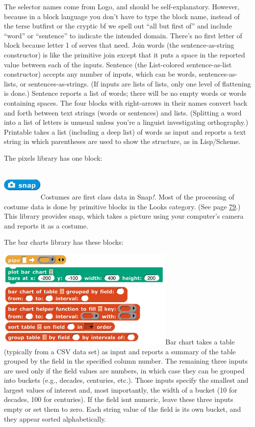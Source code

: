 The selector names come from Logo, and should be self-explanatory.
However, because in a block language you don't have to type the block
name, instead of the terse butfirst or the cryptic bf we spell out ``all
but first of'' and include ``word'' or ``sentence'' to indicate the
intended domain. There's no first letter of block because letter 1 of
serves that need. Join words (the sentence-as-string constructor) is
like the primitive join except that it puts a space in the reported
value between each of the inputs. Sentence (the List-colored
sentence-as-list constructor) accepts any number of inputs, which can be
words, sentences-as-lists, or sentences-as-strings. (If inputs are lists
of lists, only one level of flattening is done.) Sentence reports a list
of words; there will be no empty words or words containing spaces. The
four blocks with right-arrows in their names convert back and forth
between text strings (words or sentences) and lists. (Splitting a word
into a list of letters is unusual unless you're a linguist investigating
orthography.) Printable takes a list (including a deep list) of words as
input and reports a text string in which parentheses are used to show
the structure, as in Lisp/Scheme.

The pixels library has one block:

\includegraphics[width=0.77917in,height=0.62986in]{media/image395.png}Costumes
are first class data in Snap\emph{!}. Most of the processing of costume
data is done by primitive blocks in the Looks category. (See page
\hyperref[media-computation-with-costumes]{79}.) This library provides
snap, which takes a picture using your computer's camera and reports it
as a costume.

The bar charts library has these blocks:

\includegraphics[width=3.43056in,height=1.91667in]{media/image396.png}Bar
chart takes a table (typically from a CSV data set) as input and reports
a summary of the table grouped by the field in the specified column
number. The remaining three inputs are used only if the field values are
numbers, in which case they can be grouped into buckets (e.g., decades,
centuries, etc.). Those inputs specify the smallest and largest values
of interest and, most importantly, the width of a bucket (10 for
decades, 100 for centuries). If the field isn\textquotesingle t numeric,
leave these three inputs empty or set them to zero. Each string value of
the field is its own bucket, and they appear sorted alphabetically.

